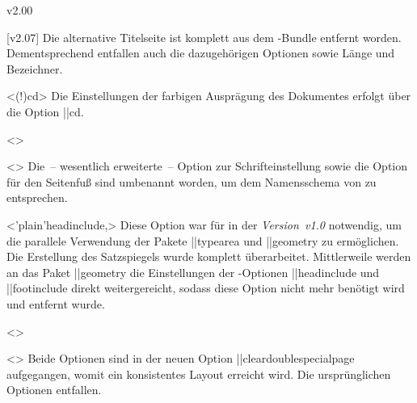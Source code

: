 \begin{Entity}{}
\begin{Changes}{v2.00}
\begin{Obsolete}
  {}
\begin{Obsolete}
  {}
\begin{Obsolete}
  {}
\begin{Obsolete}
  {}
\printdeclarationlist
%
[v2.07]%
Die alternative Titelseite ist komplett aus dem \TUDScript-Bundle entfernt 
worden. Dementsprechend entfallen auch die dazugehörigen Optionen sowie Länge 
und Bezeichner.
\end{Obsolete}
\end{Obsolete}
\end{Obsolete}
\end{Obsolete}

\begin{Obsolete}
  {}
  <\Option(!){cd}>
\printdeclarationlist
%
Die Einstellungen der farbigen Ausprägung des Dokumentes erfolgt über die 
Option \Option||{cd}.
\end{Obsolete}

\begin{Obsolete}
  {}
  <>
\begin{Obsolete}
  {}
  <>
\printdeclarationlist
%
Die~-- wesentlich erweiterte~-- Option zur Schrifteinstellung sowie die Option 
für den Seitenfuß sind umbenannt worden, um dem Namensschema von \TUDScript zu 
entsprechen.
\end{Obsolete}

\begin{Obsolete}
  {}
  <\Option'plain'{headinclude},>
\printdeclarationlist
%
Diese Option war für \TUDScript in der \emph{Version~v1.0} notwendig, um die 
parallele Verwendung der Pakete \Package||{typearea} und \Package||{geometry} 
zu ermöglichen. Die Erstellung des Satzspiegels wurde komplett überarbeitet. 
Mittlerweile werden an das Paket \Package||{geometry} die Einstellungen der 
\KOMAScript-Optionen \Option||{headinclude} und \Option||{footinclude} direkt 
weitergereicht, sodass diese Option nicht mehr benötigt wird und entfernt wurde.
\end{Obsolete}

\begin{Obsolete}
  {}
  <>
\begin{Obsolete}
  {}
  <>
\printdeclarationlist
%
Beide Optionen sind in der neuen Option \Option||{cleardoublespecialpage} 
aufgegangen, womit ein konsistentes Layout erreicht wird. Die ursprünglichen 
Optionen entfallen. 
\end{Obsolete}
\end{Obsolete}


\end{Obsolete}
\end{Changes}
\end{Entity}
